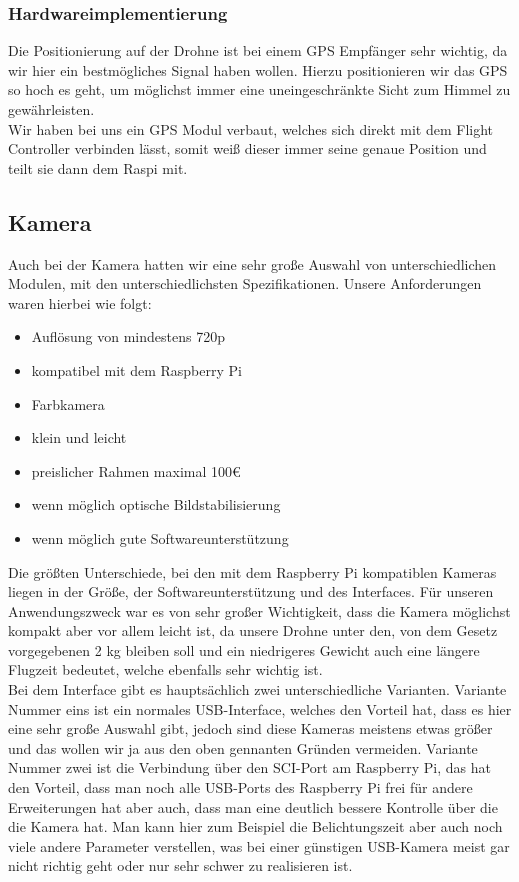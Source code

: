 \subsubsection{Hardwareimplementierung}
Die Positionierung auf der Drohne ist bei einem GPS Empfänger sehr wichtig, da wir hier ein bestmögliches Signal haben wollen. Hierzu positionieren wir das GPS so hoch es geht, um möglichst immer eine uneingeschränkte Sicht zum Himmel zu gewährleisten.\\
Wir haben bei uns ein GPS Modul verbaut, welches sich direkt mit dem Flight Controller verbinden lässt, somit weiß dieser immer seine genaue Position und teilt sie dann dem Raspi mit.

\subsection{Kamera}
Auch bei der Kamera hatten wir eine sehr große Auswahl von unterschiedlichen Modulen, mit den unterschiedlichsten Spezifikationen. Unsere Anforderungen waren hierbei  wie folgt:
\begin{itemize}
	\item Auflösung von mindestens 720p
	\item kompatibel mit dem Raspberry Pi
	\item Farbkamera
	\item klein und leicht
	\item preislicher Rahmen maximal 100€
	\item wenn möglich optische Bildstabilisierung
	\item wenn möglich gute Softwareunterstützung
\end{itemize}
Die größten Unterschiede, bei den mit dem Raspberry Pi kompatiblen Kameras liegen in der Größe, der Softwareunterstützung und des Interfaces. Für unseren Anwendungszweck war es von sehr großer Wichtigkeit, dass die Kamera möglichst kompakt aber vor allem leicht ist, da unsere Drohne unter den, von dem Gesetz vorgegebenen 2 kg bleiben soll und ein niedrigeres Gewicht auch eine längere Flugzeit bedeutet, welche ebenfalls sehr wichtig ist.\\
Bei dem Interface gibt es hauptsächlich zwei unterschiedliche Varianten. Variante Nummer eins ist ein normales USB-Interface, welches den Vorteil hat, dass es hier eine sehr große Auswahl gibt, jedoch sind diese Kameras meistens etwas größer und das wollen wir ja aus den oben gennanten Gründen vermeiden. Variante Nummer zwei ist die Verbindung über den SCI-Port am Raspberry Pi, das hat den Vorteil, dass man noch alle USB-Ports des Raspberry Pi frei für andere Erweiterungen hat aber auch, dass man eine deutlich bessere Kontrolle über die die Kamera hat. Man kann hier zum Beispiel die Belichtungszeit aber auch noch viele andere Parameter verstellen, was bei einer günstigen USB-Kamera meist gar nicht richtig geht oder nur sehr schwer zu realisieren ist.\\

